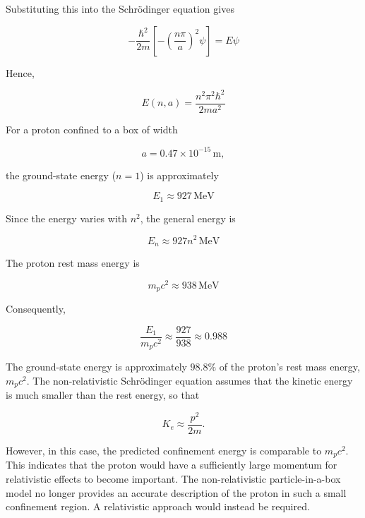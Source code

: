 \documentclass{article}
\begin{document}
Substituting this into the Schrödinger equation gives

\begin{equation*}
-\frac{\hbar^2}{2m} \left[-\left(\frac{n\pi}{a}\right)^2\psi\right] = E\psi
\end{equation*}

Hence,

\begin{equation*}
\boxed{E(n,a) = \frac{n^2\pi^2\hbar^2}{2ma^2}}
\end{equation*}

For a proton confined to a box of width

\begin{equation*}
a = 0.47\times10^{-15}\,\mathrm{m},
\end{equation*}

the ground-state energy ($n=1$) is approximately

\begin{equation*}
E_1\approx927\,\mathrm{MeV}
\end{equation*}

Since the energy varies with $n^2$, the general energy is

\begin{equation*}
\boxed{E_n\approx927n^2\,\mathrm{MeV}}
\end{equation*}

The proton rest mass energy is

\begin{equation*}
m_pc^2\approx938\,\mathrm{MeV}
\end{equation*}

Consequently,

\begin{equation*}
\frac{E_1}{m_pc^2} \approx \frac{927}{938} \approx 0.988
\end{equation*}

The ground-state energy is approximately $98.8\%$ of the proton's
rest mass energy, $m_pc^2$. The non-relativistic Schrödinger equation
assumes that the kinetic energy is much smaller than the rest energy,
so that

\begin{equation*}
K_e \approx \frac{p^2}{2m}.
\end{equation*}

However, in this case, the predicted confinement energy is comparable
to $m_pc^2$. This indicates that the proton would have a sufficiently
large momentum for relativistic effects to become important. The non-relativistic particle-in-a-box model no longer provides an accurate description of the proton in such a small confinement region. A relativistic approach would instead be required.
\end{document}
